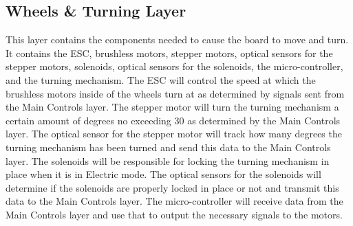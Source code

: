 \subsection{Wheels \& Turning Layer}
This layer contains the components needed to cause the board to move and turn. It contains the ESC, brushless motors, stepper motors, optical sensors for the stepper motors, solenoids, optical sensors for the solenoids, the micro-controller, and the turning mechanism. The ESC will control the speed at which the brushless motors inside of the wheels turn at as determined by signals sent from the Main Controls layer. The stepper motor will turn the turning mechanism a certain amount of degrees no exceeding 30 as determined by the Main Controls layer. The optical sensor for the stepper motor will track how many degrees the turning mechanism has been turned and send this data to the Main Controls layer. The solenoids will be responsible for locking the turning mechanism in place when it is in Electric mode. The optical sensors for the solenoids will determine if the solenoids are properly locked in place or not and transmit this data to the Main Controls layer. The micro-controller will receive data from the Main Controls layer and use that to output the necessary signals to the motors. 
